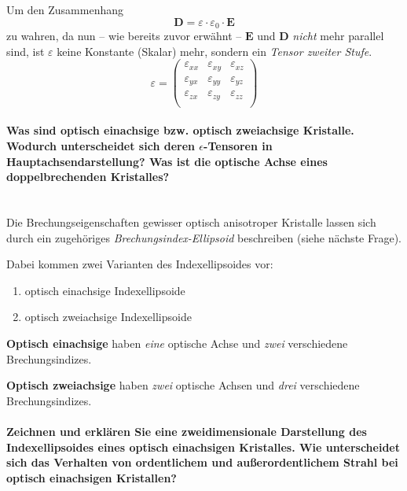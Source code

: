 \documentclass[a4paper, 11pt, ngerman, parskip=half-]{scrartcl}
\newcommand{\myparagraph}[1]{\paragraph{#1}\mbox{}\\}
\begin{document}
Um den Zusammenhang
\[\textbf{D} = \varepsilon \cdot \varepsilon_0 \cdot \textbf{E}\]
zu wahren, da nun -- wie bereits zuvor erwähnt -- $\textbf{E}$ und  $\textbf{D}$ \textit{nicht} mehr parallel sind, ist $\varepsilon$ keine Konstante (Skalar) mehr, sondern ein \textit{Tensor zweiter Stufe}.
\[\varepsilon = \begin{pmatrix}
        \varepsilon_{xx} & \varepsilon_{xy} & \varepsilon_{xz} \\
        \varepsilon_{yx} & \varepsilon_{yy} & \varepsilon_{yz} \\
        \varepsilon_{zx} & \varepsilon_{zy} & \varepsilon_{zz} \\
    \end{pmatrix}\]


\myparagraph{Was sind optisch einachsige bzw. optisch zweiachsige Kristalle. Wodurch unterscheidet sich deren $\epsilon$-Tensoren in Hauptachsendarstellung? Was ist die optische Achse eines doppelbrechenden Kristalles?}
%
Die Brechungseigenschaften gewisser optisch anisotroper Kristalle lassen sich durch ein zugehöriges \textit{Brechungsindex-Ellipsoid} beschreiben (siehe nächste Frage).

Dabei kommen zwei Varianten des Indexellipsoides vor:
\begin{enumerate}
    \item optisch einachsige Indexellipsoide
    \item optisch zweiachsige Indexellipsoide
\end{enumerate}

\textbf{Optisch einachsige} haben \textit{eine} optische Achse und \textit{zwei} verschiedene Brechungsindizes.

\textbf{Optisch zweiachsige} haben \textit{zwei} optische Achsen und \textit{drei} verschiedene Brechungsindizes.


\paragraph{Zeichnen und erklären Sie eine zweidimensionale Darstellung des Indexellipsoides eines optisch einachsigen Kristalles. Wie unterscheidet sich das Verhalten von ordentlichem und außerordentlichem Strahl bei optisch einachsigen Kristallen?}
%
\end{document}
